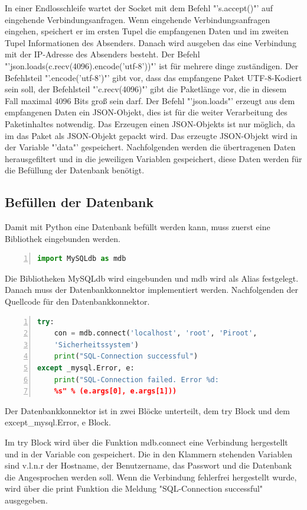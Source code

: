 In einer Endlosschleife wartet der Socket mit dem Befehl "'s.accept()"' auf eingehende Verbindungsanfragen. Wenn eingehende Verbindungsanfragen eingehen, speichert er im ersten Tupel die empfangenen Daten und im zweiten Tupel Informationen des Absenders. Danach wird ausgeben das eine Verbindung mit der IP-Adresse des Absenders besteht. Der Befehl "'json.loads(c.recv(4096).encode('utf-8'))"' ist für mehrere dinge zuständigen. Der Befehlsteil "'.encode('utf-8')"' gibt vor, dass das empfangene Paket UTF-8-Kodiert sein soll, der Befehlsteil "'c.recv(4096)"' gibt die Paketlänge vor, die in diesem Fall maximal 4096 Bits groß sein darf. Der Befehl "'json.loads"' erzeugt aus dem empfangenen Daten ein JSON-Objekt, dies ist für die weiter Verarbeitung des Paketinhaltes notwendig. Das Erzeugen einen JSON-Objekts ist nur möglich, da im  das Paket als JSON-Objekt gepackt wird. Das erzeugte JSON-Objekt wird in der Variable "'data"' gespeichert. Nachfolgenden werden die übertragenen Daten herausgefiltert und in die jeweiligen Variablen gespeichert, diese Daten werden für die Befüllung der Datenbank benötigt.

\subsection{Befüllen der Datenbank}
Damit mit Python eine Datenbank befüllt werden kann, muss zuerst eine Bibliothek eingebunden werden.
\begin{lstlisting}[caption=Einbinden der Bibliothek für die Datenbank,frame=single,numbers=left,language=Python]
import MySQLdb as mdb
\end{lstlisting}
Die Bibliotheken MySQLdb wird eingebunden und mdb wird als Alias festgelegt.\hfill
\noindent Danach muss der Datenbankkonnektor implementiert werden. Nachfolgenden der Quellcode für den Datenbankkonnektor.
\begin{lstlisting}[caption=Datenbankkonnekor,frame=single,numbers=left,language=Python,showstringspaces=false]
try:
	con = mdb.connect('localhost', 'root', 'Piroot',
	'Sicherheitssystem')
	print("SQL-Connection successful")
except _mysql.Error, e:
	print("SQL-Connection failed. Error %d:
	%s" % (e.args[0], e.args[1]))
\end{lstlisting}
Der Datenbankkonnektor ist in zwei Blöcke unterteilt, dem try Block und dem except\_mysql.Error, e Block.

Im try Block wird über die Funktion mdb.connect eine Verbindung hergestellt und in der Variable con \label{con} gespeichert. Die in den Klammern stehenden Variablen sind v.l.n.r der Hostname, der Benutzername, das Passwort und die Datenbank die Angesprochen werden soll. Wenn die Verbindung fehlerfrei hergestellt wurde, wird über die print Funktion die Meldung "SQL-Connection successful" ausgegeben.

